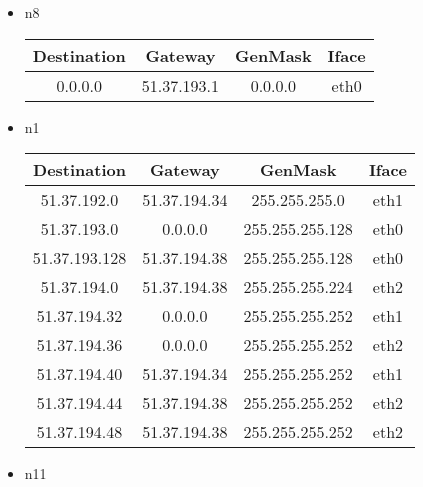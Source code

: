 \documentclass[11pt]{article} %
\begin{document}
        \begin{itemize}
            \item n8

            \begin{tabular}{ |c|c|c|c| } 
            \hline
                Destination & Gateway & GenMask & Iface \\
            \hline
                0.0.0.0 & 51.37.193.1 & 0.0.0.0 & eth0 \\
            \hline
            \end{tabular}
            \item n1
            
            \begin{tabular}{ |c|c|c|c| } 
            \hline
                Destination & Gateway & GenMask & Iface \\
            \hline
                51.37.192.0 & 51.37.194.34 & 255.255.255.0 & eth1 \\
                51.37.193.0 & 0.0.0.0 & 255.255.255.128 & eth0 \\
                51.37.193.128 & 51.37.194.38 & 255.255.255.128 & eth0 \\
                51.37.194.0 & 51.37.194.38 & 255.255.255.224 & eth2 \\
                51.37.194.32 & 0.0.0.0 & 255.255.255.252 & eth1 \\
                51.37.194.36 & 0.0.0.0 & 255.255.255.252 & eth2 \\
                51.37.194.40 & 51.37.194.34 & 255.255.255.252 & eth1 \\
                51.37.194.44 & 51.37.194.38 & 255.255.255.252 & eth2 \\
                51.37.194.48 & 51.37.194.38 & 255.255.255.252 & eth2 \\
            \hline
            \end{tabular}
            \item n11
            

\end{itemize}
\end{document}
